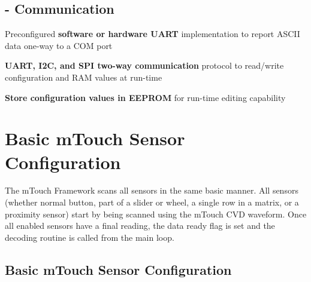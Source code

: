 \hypertarget{_framework_features_CommunicationFeatures}{}\subsection{-\/ Communication}\label{_framework_features_CommunicationFeatures}
\begin{DoxyItemize}
\item Preconfigured {\bfseries software or hardware U\+A\+R\+T} implementation to report A\+S\+C\+I\+I data one-\/way to a C\+O\+M port \item {\bfseries U\+A\+R\+T, I2\+C, and S\+P\+I two-\/way communication} protocol to read/write configuration and R\+A\+M values at run-\/time \item {\bfseries Store configuration values in E\+E\+P\+R\+O\+M} for run-\/time editing capability \end{DoxyItemize}
\hypertarget{featBasic}{}\section{Basic m\+Touch Sensor Configuration}\label{featBasic}
The m\+Touch Framework scans all sensors in the same basic manner. All sensors (whether normal \textquotesingle{}button\textquotesingle{}, part of a slider or wheel, a single row in a matrix, or a proximity sensor) start by being scanned using the m\+Touch C\+V\+D waveform. Once all enabled sensors have a \textquotesingle{}final\textquotesingle{} reading, the data ready flag is set and the decoding routine is called from the main loop.\hypertarget{feat_basic_featBasic-Config}{}\subsection{Basic m\+Touch Sensor Configuration}\label{feat_basic_featBasic-Config}

